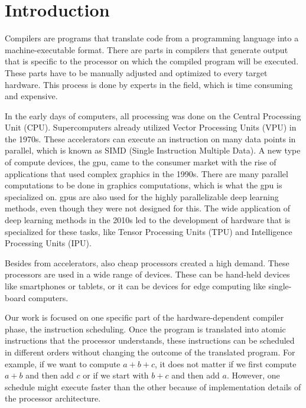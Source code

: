 \chapter{Introduction}
Compilers are programs that translate code from a programming language into a machine-executable format.
There are parts in compilers that generate output that is specific to the processor on which the compiled program will be executed.
These parts have to be manually adjusted and optimized to every target hardware.
This process is done by experts in the field, which is time consuming and expensive.

In the early days of computers, all processing was done on the Central Processing Unit (CPU).
Supercomputers already utilized Vector Processing Units (VPU) in the 1970s.
These accelerators can execute an instruction on many data points in parallel, which is known as SIMD (Single Instruction Multiple Data).
A new type of compute devices, the \ac{gpu}, came to the consumer market with the rise of applications that used complex graphics in the 1990s.
There are many parallel computations to be done in graphics computations, which is what the \ac{gpu} is specialized on.
\acp{gpu} are also used for the highly parallelizable deep learning methods, even though they were not designed for this.
The wide application of deep learning methods in the 2010s led to the development of hardware that is specialized for these tasks, like Tensor Processing Units (TPU) and Intelligence Processing Units (IPU).

Besides from accelerators, also cheap processors created a high demand.
These processors are used in a wide range of devices.
These can be hand-held devices like smartphones or tablets, or it can be devices for edge computing like single-board computers.

Our work is focused on one specific part of the hardware-dependent compiler phase, the instruction scheduling.
Once the program is translated into atomic instructions that the processor understands, these instructions can be scheduled in different orders without changing the outcome of the translated program.
For example, if we want to compute $a+b+c$, it does not matter if we first compute $a+b$ and then add $c$ or if we start with $b+c$ and then add $a$.
However, one schedule might execute faster than the other because of implementation details of the processor architecture.

